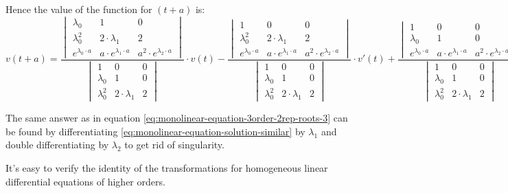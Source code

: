 \documentclass[a4paper, 11pt, oneside]{book}
\begin{document}
Hence the value of the function for $(t + a)$ is:
\begin{equation}\label{eq:monolinear-equation-3order-3rep-roots-3}
  v(t + a) = \frac{
  \begin{vmatrix}
    \lambda_0 & 1 & 0 \\
    \lambda_0^2 & 2 \cdot \lambda_1 & 2 \\
    e^{\lambda_0 \cdot a} & a \cdot e^{\lambda_1 \cdot a} & a^2 \cdot e^{\lambda_2 \cdot a}
  \end{vmatrix}
  }{
  \begin{vmatrix}
    1 & 0 & 0 \\
    \lambda_0 & 1 & 0 \\
    \lambda_0^2 & 2 \cdot \lambda_1 & 2
  \end{vmatrix}
  }
  \cdot v(t) - \frac{
  \begin{vmatrix}
    1 & 0 & 0 \\
    \lambda_0^2 & 2 \cdot \lambda_1 & 2 \\
    e^{\lambda_0 \cdot a} & a \cdot e^{\lambda_1 \cdot a} & a^2 \cdot e^{\lambda_2 \cdot a}
  \end{vmatrix}
  }{
  \begin{vmatrix}
    1 & 0 & 0 \\
    \lambda_0 & 1 & 0 \\
    \lambda_0^2 & 2 \cdot \lambda_1 & 2
  \end{vmatrix}
  }
  \cdot v'(t) + \frac{
  \begin{vmatrix}
    1 & 0 & 0 \\
    \lambda_0 & 1 & 0 \\
    e^{\lambda_0 \cdot a} & a \cdot e^{\lambda_1 \cdot a} & a^2 \cdot e^{\lambda_2 \cdot a}
  \end{vmatrix}
  }{
  \begin{vmatrix}
    1 & 0 & 0 \\
    \lambda_0 & 1 & 0 \\
    \lambda_0^2 & 2 \cdot \lambda_1 & 2
  \end{vmatrix}
  }
  \cdot v''(t)
\end{equation}

The same answer as in equation \ref{eq:monolinear-equation-3order-2rep-roots-3} can be found by differentiating \ref{eq:monolinear-equation-solution-similar} by $\lambda_1$ and double differentiating by $\lambda_2$ to get rid of singularity.

It's easy to verify the identity of the transformations for homogeneous linear differential equations of higher orders.
\end{document}
